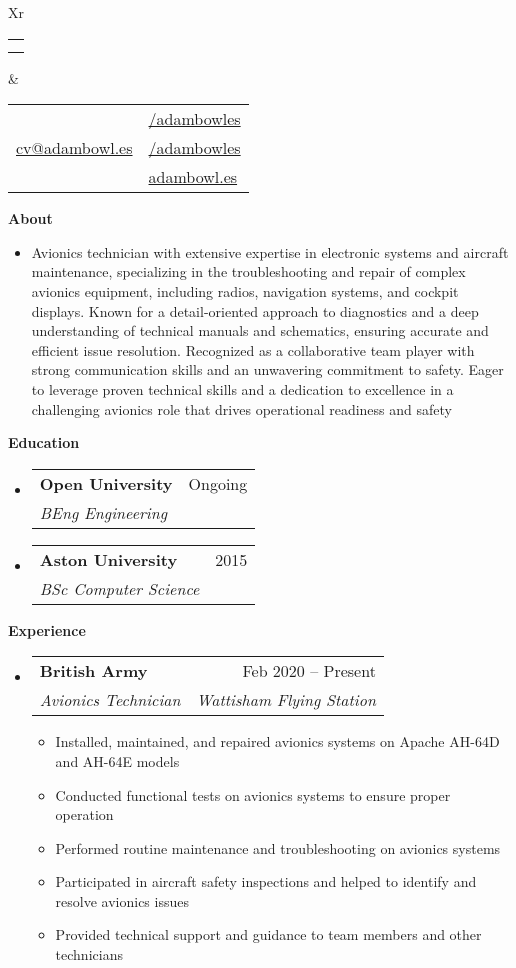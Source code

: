 \documentclass[a4paper,12pt]{article}[leftmargin=*]
\makeatletter
\def \fullname {Adam Bowles}
\def \subtitle {}
\def \linkedinicon {\faLinkedin}
\def \linkedinlink {https://linkedin.com/in/adambowles/}
\def \linkedintext {/adambowles}
\def \phoneicon {\faPhone}
\def \phonetext {07584 356713}
\def \emailicon {\faEnvelope}
\def \emaillink {mailto:cv@adambowl.es}
\def \emailtext {cv@adambowl.es}
\def \githubicon {\faGithub}
\def \githublink {https://github.com/adambowles}
\def \githubtext {/adambowles}
\def \websiteicon {\faGlobe}
\def \websitelink {https://adambowl.es/}
\def \websitetext {adambowl.es}
\def \headertype {\doublecol} %
\def \entryspacing {-0pt}
\def \linkedin {\linkedinicon \hspace{3pt}\href{\linkedinlink}{\linkedintext}}
\def \phone {\phoneicon \hspace{3pt}{ \phonetext}}
\def \email {\emailicon \hspace{3pt}\href{\emaillink}{\emailtext}}
\def \github {\githubicon \hspace{3pt}\href{\githublink}{\githubtext}}
\def \website {\websiteicon \hspace{3pt}\href{\websitelink}{\websitetext}}
\renewcommand{\section}[2]{\vspace{5pt}
  \colorbox{secondary}{\color{white}\raggedbottom\normalsize\textbf{{#1}{\hspace{7pt}#2}}}
}
\newcommand{\resumeEntryStart}{\begin{itemize}[leftmargin=2.5mm]}
\newcommand{\resumeEntryEnd}{\end{itemize}\vspace{\entryspacing}}
\newcommand{\resumeItemListStart}{\begin{itemize}[leftmargin=4.5mm]}
\newcommand{\resumeItemListEnd}{\end{itemize}}
\newcommand{\resumeItem}[1]{
  \item\small{
    {#1 \vspace{-2pt}}
  }
}
\newcommand{\resumeEntryBio}[1]{
  \item[]\small{
    {#1}
  }
}
\newcommand{\resumeEntryTSDL}[4]{
  \vspace{-1pt}\item[]
    \begin{tabularx}{0.97\textwidth}{X@{\hspace{60pt}}r}
      \textbf{\color{primary}#1} & {\firabook\color{accent}\small#2} \\
      \textit{\color{accent}\small#3} & \textit{\color{accent}\small#4} \\
    \end{tabularx}\vspace{-6pt}
}
\newcommand{\doublecol}[6]{
  \begin{tabularx}{\textwidth}{Xr}
    {
      \begin{tabular}[c]{l}
        \fontsize{35}{45}\selectfont{\color{primary}{{\textbf{\fullname}}}} \\
        {\textit{\subtitle}} %
      \end{tabular}
    } & {
      \begin{tabular}[c]{l@{\hspace{1.5em}}l}
        {\small#4} & {\small#1} \\
        {\small#5} & {\small#2} \\
        {\small#6} & {\small#3}
      \end{tabular}
    }
  \end{tabularx}
}
\newcommand{\singlecol}[6]{
  \begin{tabularx}{\textwidth}{Xr}
    {
      \begin{tabular}[b]{l}
        \fontsize{35}{45}\selectfont{\color{primary}{{\textbf{\fullname}}}} \\
        {\textit{\subtitle}} %
      \end{tabular}
    } & {
      \begin{tabular}[c]{l}
        {\small#1} \\
        {\small#2} \\
        {\small#3} \\
        {\small#4} \\
        {\small#5} \\
        {\small#6}
      \end{tabular}
    }
  \end{tabularx}
}
\makeatother
\begin{document}


\headertype{\linkedin}{\github}{\website}{\phone}{\email}{} %
\vspace{-10pt} %

\section{\faUser}{About}

  \resumeEntryStart
    \resumeEntryBio{Avionics technician with extensive expertise in electronic systems and aircraft maintenance, specializing in the troubleshooting and repair of complex avionics equipment, including radios, navigation systems, and cockpit displays. Known for a detail-oriented approach to diagnostics and a deep understanding of technical manuals and schematics, ensuring accurate and efficient issue resolution. Recognized as a collaborative team player with strong communication skills and an unwavering commitment to safety. Eager to leverage proven technical skills and a dedication to excellence in a challenging avionics role that drives operational readiness and safety}
 \resumeEntryEnd

\section{\faGraduationCap}{Education}

  \resumeEntryStart
    \resumeEntryTSDL
      {Open University}{Ongoing}
      {BEng Engineering}{}
    \resumeEntryTSDL
      {Aston University}{2015}
      {BSc Computer Science}{}
  \resumeEntryEnd

\section{\faWrench}{Experience}

  \resumeEntryStart
    \resumeEntryTSDL
      {British Army}{Feb 2020 -- Present}
      {Avionics Technician}{Wattisham Flying Station}
    \resumeItemListStart
      \resumeItem {Installed, maintained, and repaired avionics systems on Apache AH-64D and AH-64E models}
      \resumeItem {Conducted functional tests on avionics systems to ensure proper operation}
      \resumeItem {Performed routine maintenance and troubleshooting on avionics systems}
      \resumeItem {Participated in aircraft safety inspections and helped to identify and resolve avionics issues}
      \resumeItem {Provided technical support and guidance to team members and other technicians}
    \resumeItemListEnd
  \resumeEntryEnd
\end{document}
